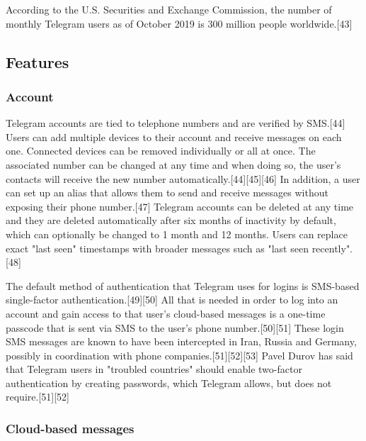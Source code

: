 \documentclass[12pt]{article}
\begin{document}
According to the U.S. Securities and Exchange Commission, the number of monthly Telegram users as of October 2019 is 300 million people worldwide.[43] 






\subsection{Features}



\subsubsection{Account}


Telegram accounts are tied to telephone numbers and are verified by SMS.[44] Users can add multiple devices to their account and receive messages on each one. Connected devices can be removed individually or all at once. The associated number can be changed at any time and when doing so, the user's contacts will receive the new number automatically.[44][45][46] In addition, a user can set up an alias that allows them to send and receive messages without exposing their phone number.[47] Telegram accounts can be deleted at any time and they are deleted automatically after six months of inactivity by default, which can optionally be changed to 1 month and 12 months. Users can replace exact "last seen" timestamps with broader messages such as "last seen recently".[48]

The default method of authentication that Telegram uses for logins is SMS-based single-factor authentication.[49][50] All that is needed in order to log into an account and gain access to that user's cloud-based messages is a one-time passcode that is sent via SMS to the user's phone number.[50][51] These login SMS messages are known to have been intercepted in Iran, Russia and Germany, possibly in coordination with phone companies.[51][52][53] Pavel Durov has said that Telegram users in "troubled countries" should enable two-factor authentication by creating passwords, which Telegram allows, but does not require.[51][52] 





\subsubsection{Cloud-based messages}
\end{document}
